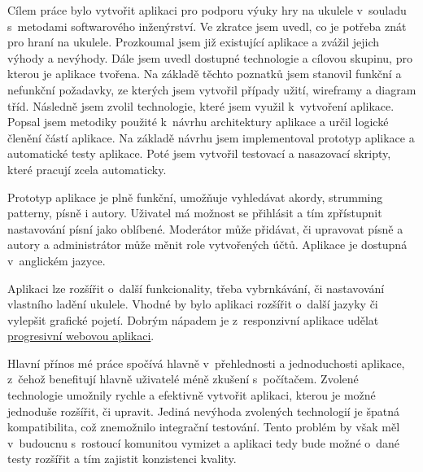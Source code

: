 \begin{conclusion}
    Cílem práce bylo vytvořit aplikaci pro podporu výuky hry na ukulele v~souladu s~metodami softwarového inženýrství. Ve zkratce jsem uvedl, co je potřeba znát pro hraní na ukulele. Prozkoumal jsem již existující aplikace a zvážil jejich výhody a nevýhody. Dále jsem uvedl dostupné technologie a cílovou skupinu, pro kterou je aplikace tvořena. Na základě těchto poznatků jsem stanovil funkční a nefunkční požadavky, ze kterých jsem vytvořil případy užití, wireframy a diagram tříd. Následně jsem zvolil technologie, které jsem využil k~vytvoření aplikace. Popsal jsem metodiky použité k~návrhu architektury aplikace a určil logické členění částí aplikace. Na základě návrhu jsem implementoval prototyp aplikace a automatické testy aplikace. Poté jsem vytvořil testovací a nasazovací skripty, které pracují zcela automaticky.

    Prototyp aplikace je plně funkční, umožňuje vyhledávat akordy, strumming patterny, písně i autory. Uživatel má možnost se přihlásit a tím zpřístupnit nastavování písní jako oblíbené. Moderátor může přidávat, či upravovat písně a autory a administrátor může měnit role vytvořených účtů. Aplikace je dostupná v~anglickém jazyce.

    Aplikaci lze rozšířit o~další funkcionality, třeba vybrnkávání, či nastavování vlastního ladění ukulele. Vhodné by bylo aplikaci rozšířit o~další jazyky či vylepšit grafické pojetí. Dobrým nápadem je z~responzivní aplikace udělat \hyperref[sss:pwa]{progresivní webovou aplikaci}.

    Hlavní přínos mé práce spočívá hlavně v~přehlednosti a jednoduchosti aplikace, z~čehož benefitují hlavně uživatelé méně zkušení s~počítačem. Zvolené technologie umožnily rychle a efektivně vytvořit aplikaci, kterou je možné jednoduše rozšířit, či upravit. Jediná nevýhoda zvolených technologií je špatná kompatibilita, což znemožnilo integrační testování. Tento problém by však měl v~budoucnu s~rostoucí komunitou vymizet a aplikaci tedy bude možné o~dané testy rozšířit a tím zajistit konzistenci kvality.
\end{conclusion}